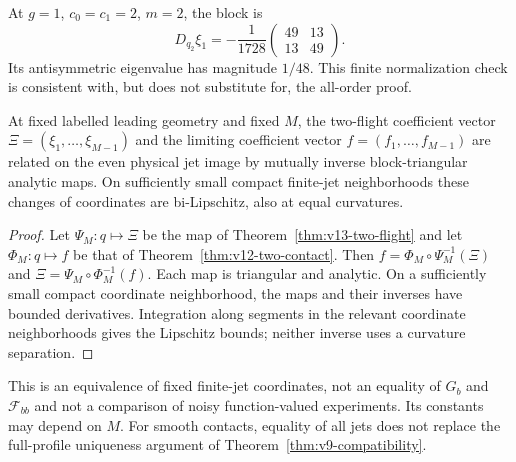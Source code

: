At $g=1$, $c_0=c_1=2$, $m=2$, the block is
\[
 D_{q_2}\xi_1=-\frac1{1728}
                   \begin{pmatrix}49&13\\13&49\end{pmatrix}.
\]
Its antisymmetric eigenvalue has magnitude $1/48$. This finite
normalization check is consistent with, but does not substitute for,
the all-order proof.

\begin{corollary}
\label{cor:v13-jet-coordinates}
At fixed labelled leading geometry and fixed $M$, the two-flight
coefficient vector $\Xi=(\xi_1,\ldots,\xi_{M-1})$ and the limiting
coefficient vector $f=(f_1,\ldots,f_{M-1})$ are related on the even
physical jet image by mutually inverse block-triangular analytic maps.
On sufficiently small compact finite-jet neighborhoods these changes
of coordinates are bi-Lipschitz, also at equal curvatures.
\end{corollary}
\begin{proof}
Let $\Psi_M:q\mapsto\Xi$ be the map of
Theorem~\ref{thm:v13-two-flight} and let $\Phi_M:q\mapsto f$ be
that of Theorem~\ref{thm:v12-two-contact}. Then
$f=\Phi_M\circ\Psi_M^{-1}(\Xi)$ and
$\Xi=\Psi_M\circ\Phi_M^{-1}(f)$. Each map is triangular and
analytic. On a sufficiently small compact coordinate neighborhood,
the maps and their inverses have bounded derivatives. Integration
along segments in the relevant coordinate neighborhoods gives the
Lipschitz bounds; neither inverse uses a curvature separation.
\end{proof}

This is an equivalence of fixed finite-jet coordinates, not an equality
of $G_b$ and $\mathcal F_{bb}$ and not a comparison of noisy
function-valued experiments. Its constants may depend on $M$. For
smooth contacts, equality of all jets does not replace the full-profile
uniqueness argument of Theorem~\ref{thm:v9-compatibility}.

